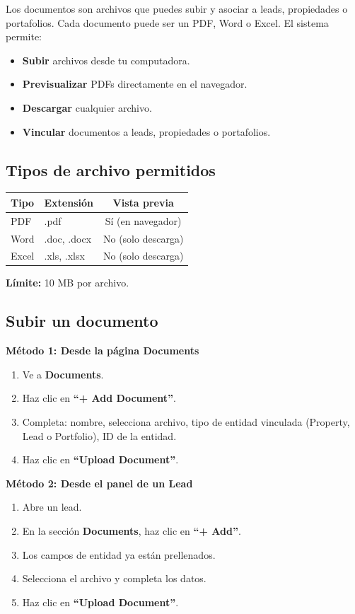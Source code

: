 \documentclass[12pt,oneside]{article}
\begin{document}
Los documentos son archivos que puedes subir y asociar a leads, propiedades o portafolios. Cada documento puede ser un PDF, Word o Excel. El sistema permite:

\begin{itemize}[leftmargin=*]
  \item \textbf{Subir} archivos desde tu computadora.
  \item \textbf{Previsualizar} PDFs directamente en el navegador.
  \item \textbf{Descargar} cualquier archivo.
  \item \textbf{Vincular} documentos a leads, propiedades o portafolios.
\end{itemize}

\subsection{Tipos de archivo permitidos}

\begin{tabularx}{\textwidth}{|X|X|c|}
\hline
\rowcolor{primary!10}
\textbf{Tipo} & \textbf{Extensión} & \textbf{Vista previa} \\
\hline
PDF & .pdf & Sí (en navegador) \\
\hline
Word & .doc, .docx & No (solo descarga) \\
\hline
Excel & .xls, .xlsx & No (solo descarga) \\
\hline
\end{tabularx}

\noindent\textbf{Límite:} 10 MB por archivo.

\subsection{Subir un documento}

\textbf{Método 1: Desde la página Documents}
\begin{enumerate}[leftmargin=*]
  \item Ve a \textbf{Documents}.
  \item Haz clic en \textbf{“+ Add Document”}.
  \item Completa: nombre, selecciona archivo, tipo de entidad vinculada (Property, Lead o Portfolio), ID de la entidad.
  \item Haz clic en \textbf{“Upload Document”}.
\end{enumerate}

\textbf{Método 2: Desde el panel de un Lead}
\begin{enumerate}[leftmargin=*]
  \item Abre un lead.
  \item En la sección \textbf{Documents}, haz clic en \textbf{“+ Add”}.
  \item Los campos de entidad ya están prellenados.
  \item Selecciona el archivo y completa los datos.
  \item Haz clic en \textbf{“Upload Document”}.
\end{enumerate}
\end{document}
